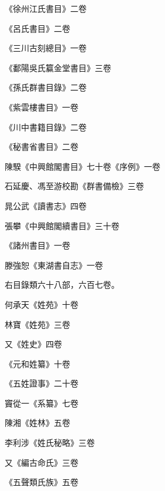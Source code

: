 \begin{pinyinscope}
 《徐州江氏書目》二卷



 《呂氏書目》二卷



 《三川古刻總目》一卷



 《鄱陽吳氏籯金堂書目》三卷



 《孫氏群書目錄》二卷



 《紫雲樓書目》一卷



 《川中書籍目錄》二卷



 《秘書省書目》二卷



 陳騤《中興館閣書目》七十卷《序例》一卷



 石延慶、馮至游校勘《群書備檢》三卷



 晁公武《讀書志》四卷



 張攀《中興館閣續書目》三十卷



 《諸州書目》一卷



 滕強恕《東湖書自志》一卷



 右目錄類六十八部，六百七卷。



 何承天《姓苑》十卷



 林寶《姓苑》三卷



 又《姓史》四卷



 《元和姓纂》十卷



 《五姓證事》二十卷



 竇從一《系纂》七卷



 陳湘《姓林》五卷



 李利涉《姓氏秘略》三卷



 又《編古命氏》三卷



 《五聲類氏族》五卷




\end{pinyinscope}
